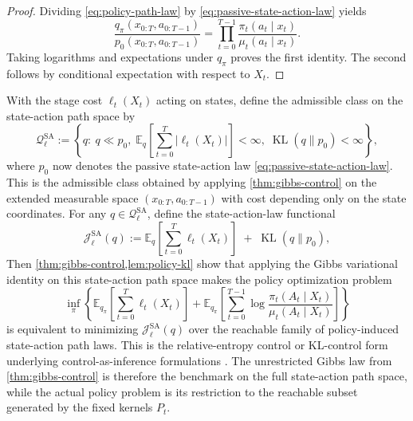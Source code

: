 \documentclass[11pt]{article}
\newcommand{\E}{\mathbb{E}}
\newcommand{\KL}{\operatorname{KL}}
\newcommand{\xtraj}{x_{0:T}}
\newcommand{\atraj}{a_{0:T-1}}
\newcommand{\qpi}{q_\pi}
\newcommand{\abs}[1]{\left\lvert #1 \right\rvert}
\newcommand{\bracks}[1]{\left[ #1 \right]}
\newcommand{\mc}{\mathcal}
\numberwithin{equation}{section}
\theoremstyle{plain}
\theoremstyle{definition}
\theoremstyle{remark}
\begin{document}
\begin{proof}
Dividing \cref{eq:policy-path-law} by \cref{eq:passive-state-action-law} yields
\[
\frac{\qpi(\xtraj,\atraj)}{p_0(\xtraj,\atraj)}
=
\prod_{t=0}^{T-1}\frac{\pi_t(a_t\mid x_t)}{\mu_t(a_t\mid x_t)}.
\]
Taking logarithms and expectations under $\qpi$ proves the first identity. The second follows by conditional expectation with respect to $X_t$.
\end{proof}

With the stage cost $\ell_t(X_t)$ acting on states, define the admissible class on the state-action path space by
\begin{equation}
\mc Q_\ell^{\mathrm{SA}}
:=
\left\{
q:\ q\ll p_0,\;
\E_q\!\bracks{\sum_{t=0}^{T}\abs{\ell_t(X_t)}}<\infty,\;
\KL(q\|p_0)<\infty
\right\},
\label{eq:state-action-admissible-class}
\end{equation}
where $p_0$ now denotes the passive state-action law \cref{eq:passive-state-action-law}. This is the admissible class obtained by applying \cref{thm:gibbs-control} on the extended measurable space $(\xtraj,\atraj)$ with cost depending only on the state coordinates. For any $q\in\mc Q_\ell^{\mathrm{SA}}$, define the state-action-law functional
\begin{equation}
\mc J_\ell^{\mathrm{SA}}(q)
:=
\E_q\!\bracks{\sum_{t=0}^{T}\ell_t(X_t)}
\;+\;
\KL(q\|p_0),
\label{eq:state-action-functional}
\end{equation}
Then \cref{thm:gibbs-control,lem:policy-kl} show that applying the Gibbs variational identity on this state-action path space makes the policy optimization problem
\begin{equation}
\inf_{\pi}
\left\{
\E_{\qpi}\!\bracks{\sum_{t=0}^{T}\ell_t(X_t)}
+
\E_{\qpi}\!\left[\sum_{t=0}^{T-1}\log\frac{\pi_t(A_t\mid X_t)}{\mu_t(A_t\mid X_t)}\right]
	\right\}
	\label{eq:policy-objective}
\end{equation}
is equivalent to minimizing $\mc J_\ell^{\mathrm{SA}}(q)$ over the reachable family of policy-induced state-action path laws. This is the relative-entropy control or KL-control form underlying control-as-inference formulations \citep{toussaintstorkey2006,todorov2006,todorov2008,todorov2009,kappen2012,rawlik2012,levine2018}. The unrestricted Gibbs law from \cref{thm:gibbs-control} is therefore the benchmark on the full state-action path space, while the actual policy problem is its restriction to the reachable subset generated by the fixed kernels $P_t$.
\end{document}
